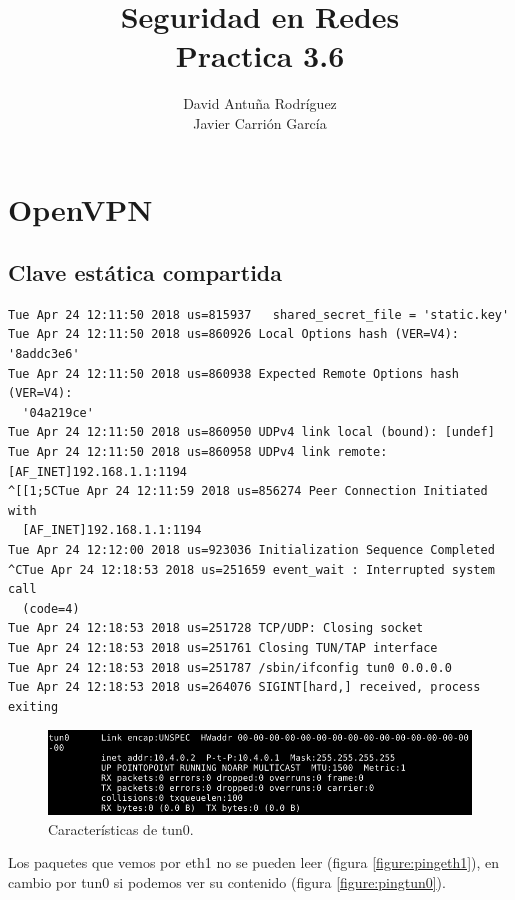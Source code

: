 \documentclass[11pt]{article}
\title{\Large Seguridad en Redes\\Practica 3.6}
\author{David Antuña Rodríguez\\Javier Carrión García}
\date{}
\begin{document}
  \raggedright

  \maketitle
  \newpage

  \section{OpenVPN}
    \subsection{Clave estática compartida}
      \lstset{basicstyle=\ttfamily\small}
\begin{lstlisting}
Tue Apr 24 12:11:50 2018 us=815937   shared_secret_file = 'static.key'
Tue Apr 24 12:11:50 2018 us=860926 Local Options hash (VER=V4): '8addc3e6'
Tue Apr 24 12:11:50 2018 us=860938 Expected Remote Options hash (VER=V4):
  '04a219ce'
Tue Apr 24 12:11:50 2018 us=860950 UDPv4 link local (bound): [undef]
Tue Apr 24 12:11:50 2018 us=860958 UDPv4 link remote: [AF_INET]192.168.1.1:1194
^[[1;5CTue Apr 24 12:11:59 2018 us=856274 Peer Connection Initiated with
  [AF_INET]192.168.1.1:1194
Tue Apr 24 12:12:00 2018 us=923036 Initialization Sequence Completed
^CTue Apr 24 12:18:53 2018 us=251659 event_wait : Interrupted system call
  (code=4)
Tue Apr 24 12:18:53 2018 us=251728 TCP/UDP: Closing socket
Tue Apr 24 12:18:53 2018 us=251761 Closing TUN/TAP interface
Tue Apr 24 12:18:53 2018 us=251787 /sbin/ifconfig tun0 0.0.0.0
Tue Apr 24 12:18:53 2018 us=264076 SIGINT[hard,] received, process exiting
\end{lstlisting}

      \begin{figure}[H]
        \centering
        \includegraphics[width = \textwidth]{tun0}
        \caption{Características de tun0.}
      \end{figure}

      \par
      Los paquetes que vemos por eth1 no se pueden leer (figura
      \ref{figure:pingeth1}), en cambio por tun0 si podemos ver su contenido
      (figura \ref{figure:pingtun0}).
\end{document}
